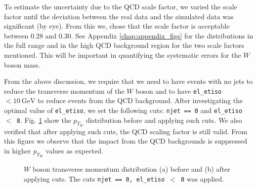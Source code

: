\documentclass[a4paper]{report}
\numberwithin{equation}{section}
\begin{document}
To estimate the uncertainty due to the QCD scale factor, we varied the scale factor until the deviation between the real data 
and the simulated data was significant (by eye). From this we, chose that the scale factor is acceptable between 0.28 and 
0.30. See Appendix \ref{chap:appendix_figs} for the distributions in the full range 
and in the high QCD background region for the two scale factors mentioned. This will be important in quantifying the systematic 
errors for the $W$ boson mass. \par 

From the above discussion, we require that we need to have events with no jets to reduce the transverse momentum of the $W$ boson and 
to have \texttt{el\_etiso} $< \SI{10}{\giga\electronvolt}$ to reduce events from the QCD background. After investigating the optimal 
value of \texttt{el\_etiso}, we set the following cuts: \texttt{njet == 0} and \texttt{el\_etiso $<$ 8}. Fig. \ref{fig:ptw_cuts} show 
the $p_{T_W}$ distribution before and applying such cuts. We also verified that after applying 
such cuts, the QCD scaling factor is still valid. From this figure we observe that the impact from the QCD backgrounds 
is suppressed in higher $p_{T_W}$ values as expected. 

\begin{figure}[htb!]
	\centering
	\quad
	\centering
	\caption{$W$ boson transverse momentum distribution (a) before and (b) after applying cuts. The cuts \texttt{njet == 0, el\_etiso $<$ 8}
    was applied.}
	\label{fig:ptw_cuts}
\end{figure}
\end{document}

